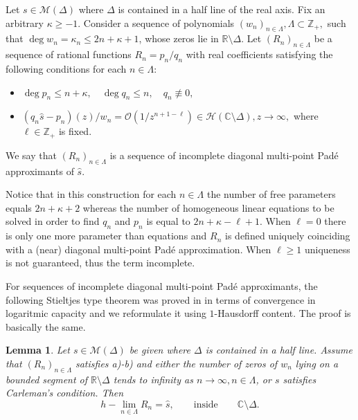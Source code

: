 \documentclass[10pt,a4paper]{article}
\newtheorem{lemma}[theorem]{Lemma}
\theoremstyle{definition}
\theoremstyle{remark}
\numberwithin{equation}{section}
\begin{document}
Let $s \in \mathcal{M}(\Delta)$ where $\Delta$ is contained in a half line of the real axis. Fix an arbitrary $\kappa \geq -1$. Consider a sequence of polynomials $(w_n)_{n \in \Lambda},  \Lambda \subset \mathbb{Z}_+,$ such that $\deg w_n = \kappa_n \leq 2n + \kappa +1$, whose zeros lie in $\mathbb{R} \setminus \Delta$. Let $(R_n)_{n \in \Lambda}$ be a sequence of rational functions $R_n = p_n/q_n$ with real coefficients satisfying the following conditions for each $n \in \Lambda$:
\begin{itemize}
\item[a)] $\deg p_n \leq n + \kappa,\quad  \deg q_n \leq n, \quad q_n \not\equiv 0,$
\item[b)] $ {(q_n \widehat{s} - p_n)(z)}/{w_n} = \mathcal{O}\left( {1}/{z^{n+1 - \ell}}\right) \in \mathcal{H}(\mathbb{C}\setminus \Delta), z \to \infty,$ where $\ell \in \mathbb{Z}_+$ is fixed.
\end{itemize}
We say that $(R_n)_{n \in \Lambda}$ is a sequence of incomplete diagonal multi-point Pad\'e approximants of $\widehat{s}$.\par
Notice that in this construction for each $n \in \Lambda$ the number of free parameters equals $2n + \kappa +2$ whereas the number of homogeneous linear equations to be solved in order to find $q_n$ and $p_n$ is equal to $2n + \kappa - \ell + 1$. When $\ell =0$ there is only one more parameter than equations and  $R_n$ is defined uniquely coinciding with a (near) diagonal multi-point Pad\'e approximation. When $\ell \geq 1$ uniqueness is not guaranteed, thus the term incomplete.\par
For sequences of incomplete diagonal multi-point Pad\'e approximants, the following Stieltjes type theorem was proved in \cite[Lemma 2]{BusLop} in terms of convergence in logaritmic capacity and we reformulate it using $1$-Hausdorff content. The proof is basically the same.

\begin{lemma} \label{BusLop}
Let $s \in \mathcal{M}(\Delta)$ be given where $\Delta$ is contained in a half line. Assume that $(R_n)_{n \in \Lambda}$ satisfies {\rm a)-b)} and either the number of zeros of $w_n$ lying on a bounded segment of $\mathbb{R} \setminus \Delta$ tends to infinity as $n\to\infty, n \in \Lambda$, or $s$ satisfies Carleman's condition.
Then
\[ h-\lim_{n \in \Lambda} R_n = \widehat{s},\qquad \mbox{inside}\qquad  \mathbb{C} \setminus \Delta.
\]
\end{lemma}
\end{document}
